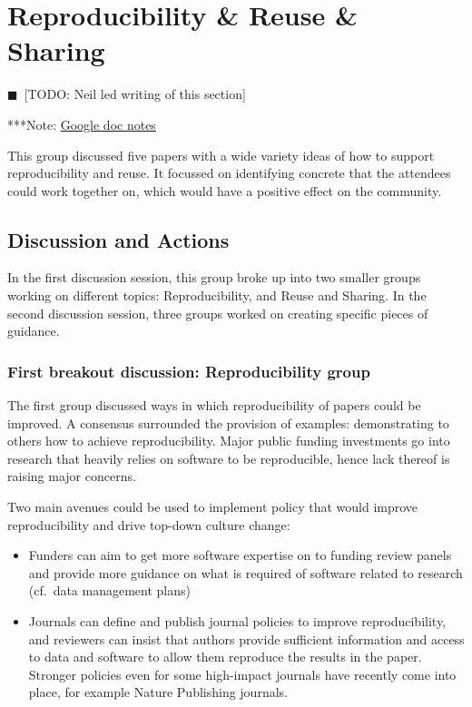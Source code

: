 \documentclass[11pt, oneside]{amsart}
\newcommand{\todo}[1]{{\color{blue}$\blacksquare$~\textsf{[TODO: #1]}}}
\newcommand{\note}[1]{ {\textcolor{blueish}    { ***Note:      #1 }}}
\begin{document}
\section{Reproducibility \& Reuse \& Sharing} \label{sec:reproduce}
\todo{Neil led writing of this section}

\note{\href{http://tinyurl.com/kqpe87z}{Google doc notes}}

This group discussed five papers with a wide variety ideas of how to support reproducibility and reuse. It focussed on identifying concrete that the attendees could work together on, which would have a positive effect on the community.

\subsection{Discussion and Actions}

In the first discussion session, this group broke up into two smaller groups working on different topics: Reproducibility, and Reuse and Sharing. In the second discussion session, three groups worked on creating specific pieces of guidance.

\subsubsection{First breakout discussion: Reproducibility group}

The first group discussed ways in which reproducibility of papers could be improved. A consensus surrounded the provision of examples: demonstrating to others how to achieve reproducibility. Major public funding investments go into research that heavily relies on software to be reproducible, hence lack thereof is raising major concerns.

Two main avenues could be used to implement policy that would improve reproducibility and drive top-down culture change:
\begin{itemize}
\item Funders can aim to get more software expertise on to funding review panels and provide more guidance on what is required of software related to research (cf.\ data management plans)
\item Journals can define and publish journal policies to improve reproducibility, and reviewers can insist that authors provide sufficient information and access to data and software to allow them reproduce the results in the paper. Stronger policies even for some high-impact journals have recently come into place, for example Nature Publishing journals.
\end{itemize}
\end{document}

